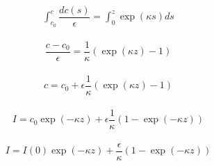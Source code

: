 \begin{align}
	\int_{c_0}^c \dfrac{d c(s)}{\epsilon}  =  \int_0^z \exp(\kappa s) ds
\end{align}

\begin{align}
	\dfrac{c - c_0}{\epsilon}  = \dfrac{1}{\kappa} \left(\exp(\kappa z) - 1\right)
\end{align}

\begin{align}
	c = c_0 + \epsilon \dfrac{1}{\kappa} \left(\exp(\kappa z) - 1\right)
\end{align}

\begin{align}
	I = c_0 \exp( - \kappa z) + \epsilon \dfrac{1}{\kappa} \left(1 - \exp( - \kappa z)\right)
\end{align}

\begin{align}
	I = I(0) \exp( - \kappa z) +  \dfrac{\epsilon}{\kappa} \left(1 - \exp( - \kappa z)\right)
\end{align}

